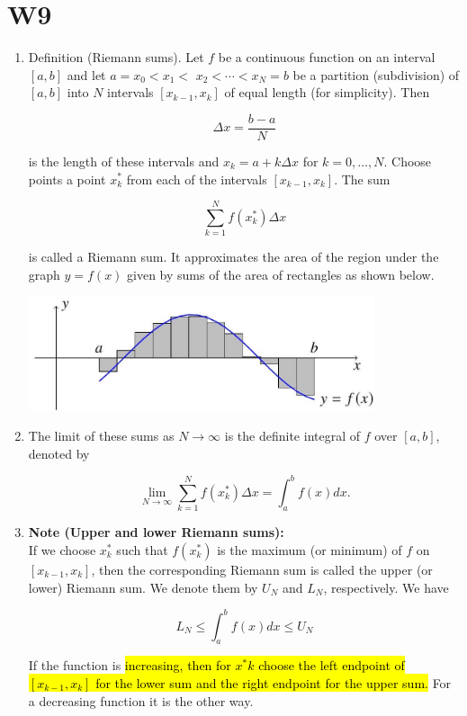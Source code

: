 \documentclass[10pt]{article}
\begin{document}
\section{W9}
\begin{enumerate}

\item Definition (Riemann sums). Let $f$ be a continuous function on an interval $[a, b]$ and let $a=x_{0}<x_{1}<$ $x_{2}<\cdots<x_{N}=b$ be a partition (subdivision) of $[a, b]$ into $N$ intervals $\left[x_{k-1}, x_{k}\right]$ of equal length (for simplicity). Then

$$
\Delta x=\frac{b-a}{N}
$$

is the length of these intervals and $x_{k}=a+k \Delta x$ for $k=0, \ldots, N$. Choose points a point $x_{k}^{*}$ from each of the intervals $\left[x_{k-1}, x_{k}\right]$. The sum

$$
\sum_{k=1}^{N} f\left(x_{k}^{*}\right) \Delta x
$$

is called a Riemann sum. It approximates the area of the region under the graph $y=f(x)$ given by sums of the area of rectangles as shown below.

\begin{center}
\includegraphics[width=0.8\textwidth]{images/W9-1.jpg}\\
\end{center}

\item The limit of these sums as $N \rightarrow \infty$ is the definite integral of $f$ over $[a, b]$, denoted by

$$
\lim _{N \rightarrow \infty} \sum_{k=1}^{N} f\left(x_{k}^{*}\right) \Delta x=\int_{a}^{b} f(x) d x .
$$

\item \textbf{Note (Upper and lower Riemann sums):}\\
If we choose $x_{k}^{*}$ such that $f\left(x_{k}^{*}\right)$ is the maximum (or minimum) of $f$ on $\left[x_{k-1}, x_{k}\right]$, then the corresponding Riemann sum is called the upper (or lower) Riemann sum. We denote them by $U_{N}$ and $L_{N}$, respectively. We have

$$
L_{N} \leq \int_{a}^{b} f(x) d x \leq U_{N}
$$

If the function is \hl{increasing, then for $x^{*} k$ choose the left endpoint of $\left[x_{k-1}, x_{k}\right]$ for the lower sum and the right endpoint for the upper sum. }For a decreasing function it is the other way.

\end{enumerate}
\end{document}
